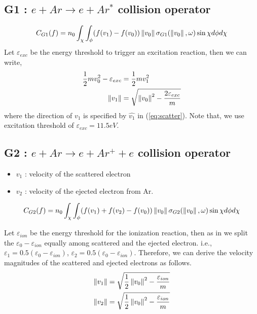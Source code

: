 \documentclass{article}[draft]
\begin{document}
\subsection{G1 : $e + Ar \rightarrow e + Ar^*$ collision operator}
\begin{equation}
    C_{G1}(f) = n_0 \int_{\chi} \int_{\phi} (f(v_1) - f(v_0)) \left\lVert v_0\right\rVert \sigma_{G1}(\left\lVert v_0\right\rVert,\omega) \sin\chi d\phi d\chi
\end{equation}
Let $\varepsilon_{exc}$ be the energy threshold to trigger an excitation reaction, then we can write, 
\begin{align}
    \frac{1}{2} m v_0 ^2  - \varepsilon_{exc} &= \frac{1}{2} m v_1 ^2 \\
    \left\lVert v_1\right\rVert &= \sqrt{\left\lVert v_0\right\rVert^2 - \frac{2\varepsilon_{exc}}{m}}
\end{align} where the direction of $v_1$ is specified by $\hat{v_1}$ in (\ref{eq:scatter}). Note that, we use excitation threshold of $\varepsilon_{exc}=11.5eV$.

\subsection{G2 : $e + Ar \rightarrow e + Ar^+ + e$ collision operator}
\begin{itemize}
    \item $v_1$ : velocity of the scattered electron
    \item $v_2$ : velocity of the ejected electron from Ar. 
\end{itemize}
\begin{equation}
    C_{G2}(f) = n_0 \int_{\chi} \int_{\phi} (f(v_1) + f(v_2) - f(v_0)) \left\lVert v_0\right\rVert \sigma_{G2}(\left\lVert v_0\right\rVert,\omega) \sin\chi d\phi d\chi
\end{equation}

Let $\varepsilon_{ion}$ be the energy threshold for the ionization reaction, then as in \cite{vahedi1995monte} we split the $\varepsilon_0-\varepsilon_{ion}$ equally among scattered and the ejected electron. i.e., $\varepsilon_1 = 0.5 (\varepsilon_0-\varepsilon_{ion})$, $\varepsilon_2 = 0.5 (\varepsilon_0-\varepsilon_{ion})$. Therefore, we can derive the velocity magnitudes of the scattered and ejected electrons as follows. 
\begin{align}
    \left\lVert v_1\right\rVert &= \sqrt{\frac{1}{2}\left\lVert v_0\right\rVert^2 - \frac{\varepsilon_{ion}}{m}}\\
    \left\lVert v_2\right\rVert &= \sqrt{\frac{1}{2}\left\lVert v_0\right\rVert^2 - \frac{\varepsilon_{ion}}{m}}
\end{align}
\end{document}
